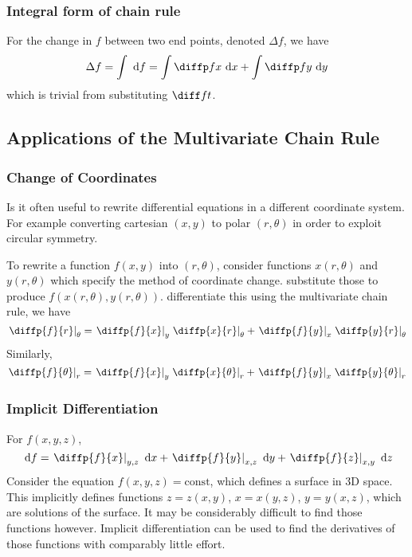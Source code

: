 \documentclass[12pt]{article}
\begin{document}
\subsubsection*{Integral form of chain rule}

For the change in $f$ between two end points, denoted $\Delta f$, we have
\[
    \Delta f = \int \di f = \int \diffp fx \di x + \int \diffp fy \di y
\]
which is trivial from substituting $\diff ft$.

\subsection{Applications of the Multivariate Chain Rule}

\subsubsection*{Change of Coordinates}

Is it often useful to rewrite differential equations
in a different coordinate system.
For example converting cartesian $(x,y)$ to 
polar $(r,\theta )$ in order to exploit circular symmetry.

To rewrite a function $f(x,y)$ into $(r,\theta)$,
consider functions $x(r,\theta)$ and $y(r,\theta)$
which specify the method of coordinate change.
substitute those to produce $f(x(r,\theta),y(r,\theta ))$.
differentiate this using the multivariate chain rule,
we have
\[
    \left.\diffp{f}{r}\right|_{\theta } = \left.\diffp{f}{x}\right|_{y}\left.\diffp{x}{r}\right|_{\theta }
                + \left.\diffp{f}{y}\right|_{x}\left.\diffp{y}{r}\right|_{\theta }
\]
Similarly,
\[
    \left.\diffp{f}{\theta }\right|_{r} = \left.\diffp{f}{x}\right|_{y}\left.\diffp{x}{\theta }\right|_{r}
                + \left.\diffp{f}{y}\right|_{x}\left.\diffp{y}{\theta }\right|_{r}
\]

\subsubsection*{Implicit Differentiation}

For $f(x,y,z)$,
\[
\di f = \left.\diffp{f}{x}\right|_{y,z} \di x + \left.\diffp{f}{y}\right|_{x,z} \di y + \left.\diffp{f}{z}\right|_{x,y} \di z
\]
Consider the equation $f(x,y,z) = \text{const}$,
which defines a surface in 3D space.
This implicitly defines functions
$z = z(x,y)$, $x = x(y,z)$, $y = y(x,z)$,
which are solutions of the surface.
It may be considerably difficult to find those functions however.
Implicit differentiation can be used to find the
derivatives of those functions with comparably
little effort.
\end{document}
